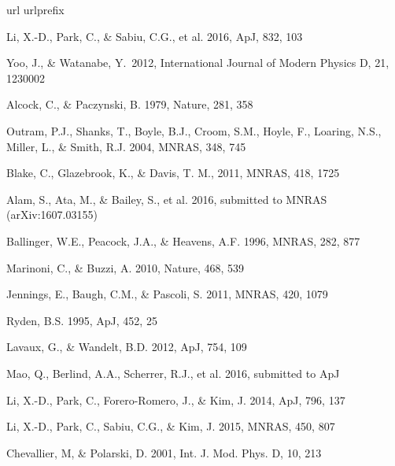 \documentclass{natureprintstyle}
\begin{document}
\begin{thebibliography}{10}
\expandafter\ifx\csname url\endcsname\relax
  \def\url#1{\texttt{#1}}\fi
\expandafter\ifx\csname urlprefix\endcsname\relax\def\urlprefix{URL }\fi
\providecommand{\bibinfo}[2]{#2}
\providecommand{\eprint}[2][]{\url{#2}}

Li, X.-D., Park, C., \& Sabiu, C.G., et al. 2016, ApJ, 832, 103

Yoo, J., \& Watanabe, Y.\ 2012, International Journal of Modern Physics D, 21, 1230002 

Alcock, C., \& Paczynski, B. 1979, Nature, 281, 358  

Outram, P.J., Shanks, T., Boyle, B.J., Croom, S.M., Hoyle, F., Loaring, N.S., 
Miller, L., \& Smith, R.J. 2004, MNRAS, 348, 745  

Blake, C., Glazebrook, K., \& Davis, T. M., 2011, MNRAS, 418, 1725  

Alam, S., Ata, M., \& Bailey, S., et al. 2016,
submitted to MNRAS (arXiv:1607.03155)

Ballinger, W.E., Peacock, J.A., \& Heavens, A.F. 1996, MNRAS, 282, 877  

Marinoni, C., \& Buzzi, A. 2010, Nature, 468, 539  

Jennings, E., Baugh, C.M., \& Pascoli, S. 2011, MNRAS, 420, 1079  

Ryden, B.S. 1995, ApJ, 452, 25  

Lavaux, G., \& Wandelt, B.D. 2012, ApJ, 754, 109  

Mao, Q., Berlind, A.A., Scherrer, R.J., et al. 2016, submitted to ApJ


Li, X.-D., Park, C., Forero-Romero, J., \& Kim, J. 2014, ApJ, 796, 137

Li, X.-D., Park, C., Sabiu, C.G., \& Kim, J. 2015, MNRAS, 450, 807 

Chevallier, M, \& Polarski, D. 2001, Int. J. Mod. Phys. D,  10, 213


\end{thebibliography}
\end{document}
